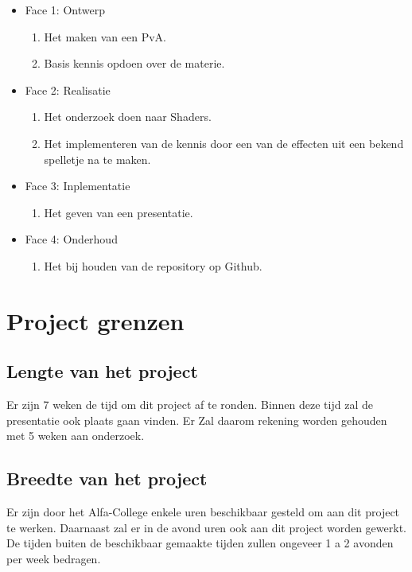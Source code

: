 \documentclass[]{report}
\begin{document}
\begin{itemize}
	\item Face 1: Ontwerp
	\begin{enumerate}
		\item Het maken van een PvA.
		\item Basis kennis opdoen over de materie.
			\newline
	\end{enumerate} 
	
	\item Face 2: Realisatie
	\begin{enumerate}
		\item Het onderzoek doen naar Shaders.
		\item Het implementeren van de kennis door een van de effecten uit een bekend spelletje na te maken.
			\newline
	\end{enumerate} 
	
	\item Face 3: Inplementatie
	\begin{enumerate}
		\item Het geven van een presentatie.
		\newline
	\end{enumerate}

	\item Face 4: Onderhoud
	\begin{enumerate}
		\item Het bij houden van de repository op Github.
		\newline
	\end{enumerate}
\end{itemize} 





\chapter{Project grenzen}

\section{Lengte van het project}
Er zijn 7 weken de tijd om dit project af te ronden. Binnen deze tijd zal de presentatie ook plaats gaan vinden. Er Zal daarom rekening worden gehouden met 5 weken aan onderzoek.

\section{Breedte van het project}
Er zijn door het Alfa-College enkele uren beschikbaar gesteld om aan dit project te werken. Daarnaast zal er in de avond uren ook aan dit project worden gewerkt. De tijden buiten de beschikbaar gemaakte tijden zullen ongeveer 1 a 2 avonden per week bedragen. 
\end{document}
